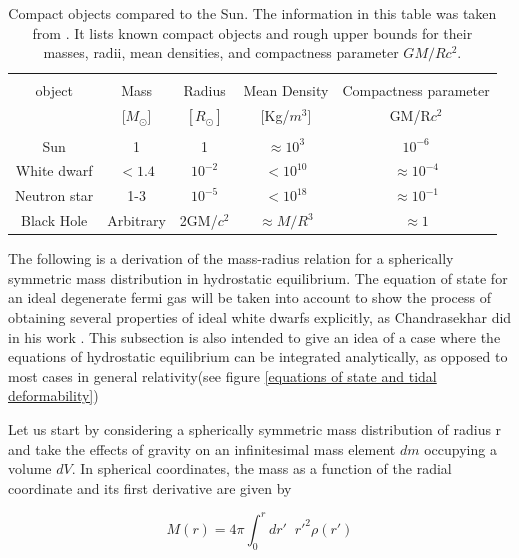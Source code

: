 \begin{table}[!htbp]
\begin{center}
\begin{tabular}{ccccc}
\hline\\
object &Mass&Radius& Mean Density& Compactness parameter \\
       & [$M_\odot$]& $[R_\odot]$& [Kg/$m^3$]& GM/R$c^2$  \\
\hline \\
Sun           &1          &1         &$\approx 10^{3}$   &$ 10^{-6}$ \\
White dwarf   &$< 1.4$ &$10^{-2}$    &$< 10^{10}$        &$\approx 10^{-4}$ \\
Neutron star  &1-3        &$10^{-5}$ &$< 10^{18}$        &$\approx 10^{-1}$ \\
Black Hole    &Arbitrary  &2GM/$c^2$ & $\approx M/R^{3}$ & $\approx 1$ \\
\hline
\end{tabular}
\captionsetup{width=.8\textwidth}
\caption[Compact objects compared to the Sun]{Compact objects compared to the Sun. The information in this table was taken from \cite{Shapiro:1983du}. It lists known compact objects and rough upper bounds for their masses, radii, mean densities, and compactness parameter $GM/Rc^2$.}
\label{compactness}
\end{center}
\end{table}

The following is a derivation of the mass-radius relation for a spherically symmetric mass distribution in hydrostatic equilibrium. The equation of state for an ideal degenerate fermi gas will be taken into account to show the process of obtaining several properties of ideal white dwarfs explicitly, as Chandrasekhar did in his work \cite{Chandrasekhar:1931ih}. This subsection is also intended to give an idea of a case where the equations of hydrostatic equilibrium can be integrated analytically, as opposed to most cases in general relativity(see figure \ref{equations of state and tidal deformability})

Let us start by considering a spherically symmetric mass distribution of radius r and take the effects of gravity on an infinitesimal mass element $dm$ occupying a volume $dV$. In spherical coordinates, the mass as a function of the radial coordinate and its first derivative are given by


\begin{equation}\label{mass}
M(r) = 4\pi  \int_0^{r} dr' \;\; r'^2 \rho(r') 
\end{equation}

